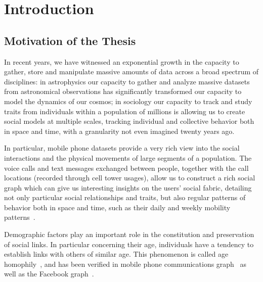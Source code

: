 
\chapter{Introduction}

\section{Motivation of the Thesis}

In recent years, we have witnessed an exponential growth in the capacity to gather, store and manipulate massive amounts of data across a broad spectrum of disciplines: in astrophysics our capacity to gather and analyze massive datasets from astronomical observations has significantly transformed our capacity to model the dynamics of our cosmos; in sociology our capacity to track and study traits from individuals within a population of millions is allowing us to create social models at multiple scales, tracking individual and collective behavior both in space and time, with a granularity not even imagined twenty years ago.

In particular, mobile phone datasets provide a very rich view into the social interactions and the physical movements of large segments of a population. The voice calls and text messages exchanged between people, together with the call locations (recorded through cell tower usages), allow us to construct a rich social graph which can give us interesting insights on the users' social fabric, detailing not only particular social relationships and traits, but also regular patterns of behavior both in space and time, such as their daily and weekly mobility patterns~\cite{gonzalez2008understanding,ponieman2013human,sarraute2015city}.

Demographic factors play an important role in the constitution and preservation of social links. In particular concerning their age, individuals have a tendency to
establish links with others of similar age. This phenomenon is called age homophily~\cite{mcpherson2001birds}, and has been verified in mobile phone communications graph~\cite{blumenstock2010mobile,sarraute2014} as well as the Facebook graph~\cite{ugander2011anatomy}.



